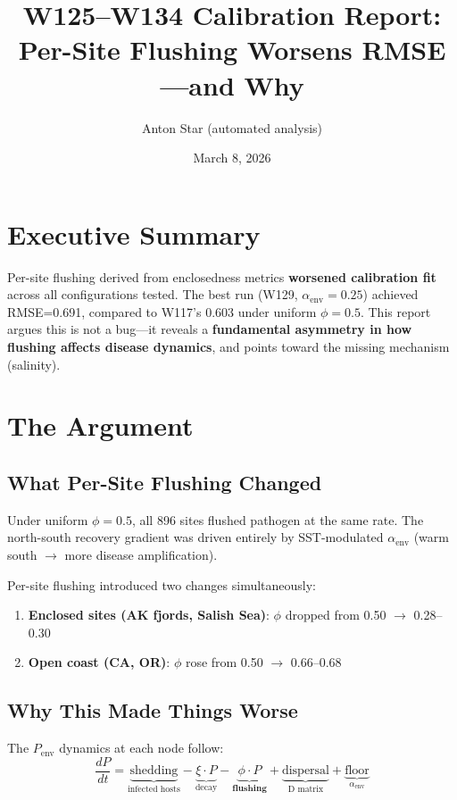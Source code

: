 \documentclass[11pt]{article}
\title{W125--W134 Calibration Report:\\Per-Site Flushing Worsens RMSE---and Why}
\author{Anton Star (automated analysis)}
\date{March 8, 2026}
\begin{document}
\maketitle

\section{Executive Summary}

Per-site flushing derived from enclosedness metrics \textbf{worsened calibration fit} across all configurations tested. The best run (W129, $\alpha_\text{env}=0.25$) achieved RMSE=0.691, compared to W117's 0.603 under uniform $\phi=0.5$. This report argues this is not a bug---it reveals a \textbf{fundamental asymmetry in how flushing affects disease dynamics}, and points toward the missing mechanism (salinity).

\section{The Argument}

\subsection{What Per-Site Flushing Changed}

Under uniform $\phi=0.5$, all 896 sites flushed pathogen at the same rate. The north-south recovery gradient was driven entirely by SST-modulated $\alpha_\text{env}$ (warm south $\rightarrow$ more disease amplification).

Per-site flushing introduced two changes simultaneously:
\begin{enumerate}
    \item \textbf{Enclosed sites (AK fjords, Salish Sea)}: $\phi$ dropped from 0.50 $\rightarrow$ 0.28--0.30
    \item \textbf{Open coast (CA, OR)}: $\phi$ rose from 0.50 $\rightarrow$ 0.66--0.68
\end{enumerate}

\subsection{Why This Made Things Worse}

The $P_\text{env}$ dynamics at each node follow:
\begin{equation}
\frac{dP}{dt} = \underbrace{\text{shedding}}_{\text{infected hosts}} - \underbrace{\xi \cdot P}_{\text{decay}} - \underbrace{\phi \cdot P}_{\textbf{flushing}} + \underbrace{\text{dispersal}}_{\text{D matrix}} + \underbrace{\text{floor}}_{\alpha_\text{env}}
\end{equation}
\end{document}
